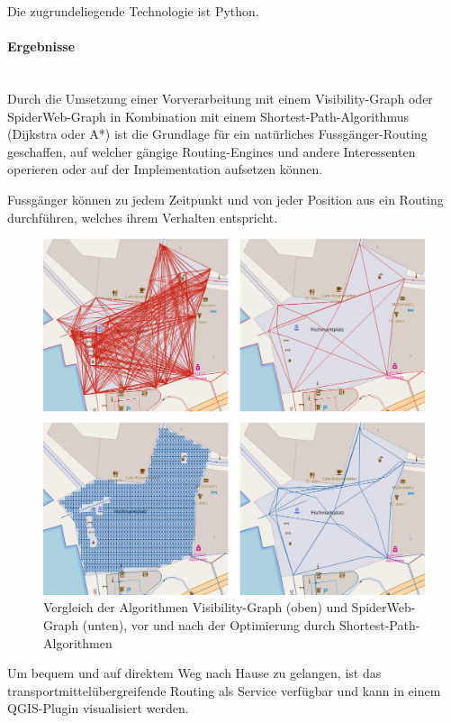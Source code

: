 Die zugrundeliegende Technologie ist Python.

\paragraph{Ergebnisse}~\\
Durch die Umsetzung einer Vorverarbeitung mit einem Visibility-Graph oder SpiderWeb-Graph in Kombination mit einem \gls{Shortest-Path}-Algorithmus (Dijkstra oder A*) ist die Grundlage für ein natürliches Fussgänger-Routing geschaffen, auf welcher gängige Routing-Engines und andere Interessenten operieren oder auf der Implementation aufsetzen können.

Fussgänger können zu jedem Zeitpunkt und von jeder Position aus ein Routing durchführen, welches ihrem Verhalten entspricht.

\begin{figure}[H]
    \centering
    \includegraphics[width=0.8\linewidth]{technicalreport/img/proprecessing_optimization_comparison.png}
    \caption[Vergleich Preprocessing mit und ohne Optimierung]{Vergleich der Algorithmen Visibility-Graph (oben) und SpiderWeb-Graph (unten), vor und nach der Optimierung durch \gls{Shortest-Path}-Algorithmen}
    \label{fig:proprecessing_optimization_comparison}
\end{figure}

Um bequem und auf direktem Weg nach Hause zu gelangen, ist das transportmittelübergreifende Routing als Service verfügbar und kann in einem QGIS-Plugin visualisiert werden.

